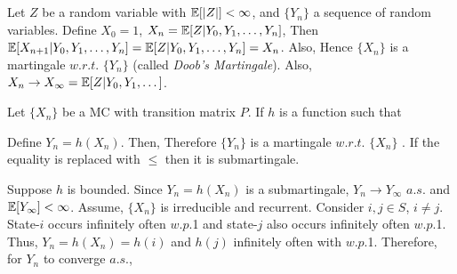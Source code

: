 \documentclass[all-lectures.tex]{subfiles}
\begin{document}

\setcounter{section}{5}
\setcounter{subsection}{1}

\section*{}
\chr
\begin{exmp}
Let $Z$ be a random variable with  $\mathbb{E}[|Z|] < \infty$, and  $\{Y_n\}$ a sequence of random variables. Define
$X_0=1$, $X_n = \mathbb{E}[Z|Y_0, Y_1, \dots, Y_n]$, Then $\mathbb{E}[X_{n+1}|Y_0, Y_1, \dots, Y_n] = \mathbb{E}[Z|Y_0, Y_1, \dots, Y_n] = X_n$. Also,
Hence $\{X_n\}$ is a martingale $w.r.t.$ $\{Y_n\}$ (called \textit{Doob's Martingale}).
Also, $X_n \to X_\infty = \mathbb{E}[Z|Y_0, Y_1, \dots]$.
\end{exmp}

\begin{exmp}
Let $\{X_n\}$ be a MC with transition matrix $P$.
If $h$ is a function such that 

Define $Y_n = h(X_n)$. Then,
Therefore $\{Y_n\}$ is a martingale $w.r.t.$ $\{X_n\}$ .
If the equality is replaced with $\le$ then it is submartingale.
\end{exmp}

Suppose $h$ is bounded. Since $Y_n = h(X_n)$ is a submartingale, $Y_n \to Y_\infty$ $a.s.$ and $\mathbb{E}[Y_\infty] < \infty$.
Assume, $\{X_n\}$ is irreducible and recurrent.
Consider $i, j \in S$, $i\neq j$. 
State-$i$ occurs infinitely often $w.p.$1 and state-$j$ also occurs infinitely often $w.p.$1.
Thus, 
$Y_n = h(X_n) = h(i)$ and $h(j)$ infinitely often with $w.p.$1.
Therefore, for $Y_n$ to converge $a.s.$,
\end{document}
